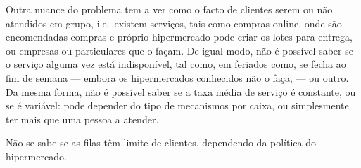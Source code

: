 Outra nuance do problema tem a ver como o facto de clientes serem ou não
atendidos em grupo, i.e.\, existem serviços, tais como compras online, onde são
encomendadas compras e próprio hipermercado pode criar os lotes para entrega, ou
empresas ou particulares que o façam. De igual modo, não é possível saber se
o serviço alguma vez está indisponível, tal como, em feriados como, se fecha ao
fim de semana --- embora os hipermercados conhecidos não o faça, --- ou outro. Da
mesma forma, não é possível saber se a taxa média de serviço é constante, ou se
é variável: pode depender do tipo de mecanismos por caixa, ou simplesmente ter
mais que uma pessoa a atender. 
  
Não se sabe se as filas têm limite de clientes, dependendo da política do
hipermercado.







